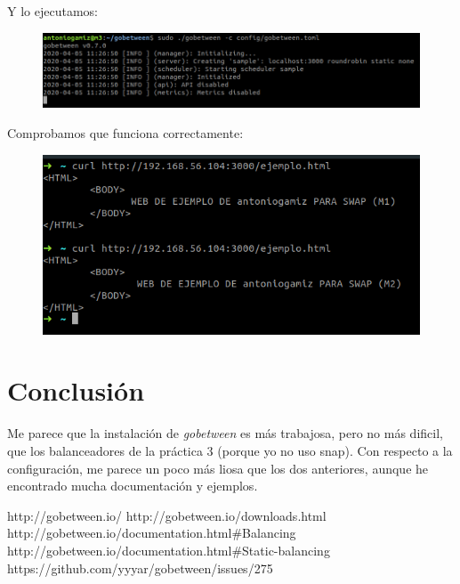 \documentclass[12pt]{article}
\begin{document}
Y lo ejecutamos:

\begin{figure}[H]
  \center
  \includegraphics[scale=0.5]{img/4.png}
\end{figure}

Comprobamos que funciona correctamente:

\begin{figure}[H]
  \center
  \includegraphics[scale=0.5]{img/5.png}
\end{figure}


\section{Conclusión}

Me parece que la instalación de \textit{gobetween} es más trabajosa, pero no más dificil, que los balanceadores de la práctica 3 (porque yo no uso snap). Con respecto a la configuración, me parece un poco más liosa que los dos anteriores, aunque he encontrado mucha documentación y ejemplos.

\begin{thebibliography}{9}
http://gobetween.io/
http://gobetween.io/downloads.html
http://gobetween.io/documentation.html\#Balancing
http://gobetween.io/documentation.html\#Static-balancing
https://github.com/yyyar/gobetween/issues/275
\end{thebibliography}
\end{document}
